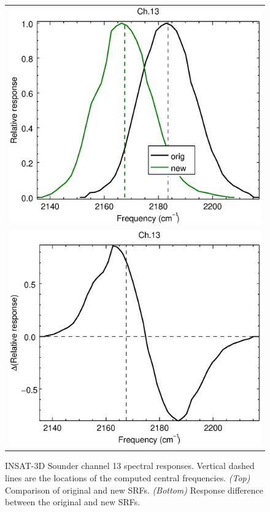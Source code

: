 \begin{figure}[H]
  \centering
  \begin{tabular}{c}
    \includegraphics[scale=0.55]{graphics/sndr/srf/sndr_insat3d-13.eps} \\
    \includegraphics[scale=0.55]{graphics/sndr/srf/sndr_insat3d-13.difference.eps}
  \end{tabular}
  \caption{INSAT-3D Sounder channel 13 spectral responses. Vertical dashed lines are the locations of the computed central frequencies. \emph{(Top)} Comparison of original and new SRFs. \emph{(Bottom)} Response difference between the original and new SRFs.}
  \label{fig:sndr_ch13}
\end{figure}


